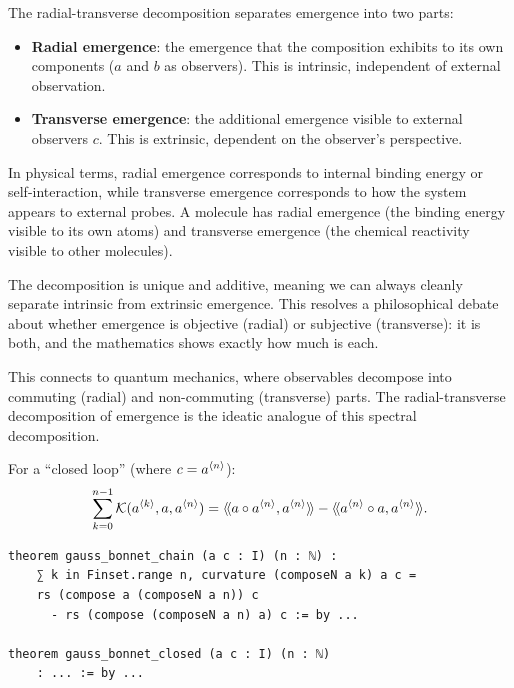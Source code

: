 \begin{interpretation}
The radial-transverse decomposition separates emergence into two parts:
\begin{itemize}
  \item \textbf{Radial emergence}: the emergence that the composition exhibits
    to its own components ($a$ and $b$ as observers). This is intrinsic,
    independent of external observation.
  \item \textbf{Transverse emergence}: the additional emergence visible to
    external observers $c$. This is extrinsic, dependent on the observer's
    perspective.
\end{itemize}

In physical terms, radial emergence corresponds to internal binding energy or
self-interaction, while transverse emergence corresponds to how the system
appears to external probes. A molecule has radial emergence (the binding energy
visible to its own atoms) and transverse emergence (the chemical reactivity
visible to other molecules).

The decomposition is unique and additive, meaning we can always cleanly separate
intrinsic from extrinsic emergence. This resolves a philosophical debate about
whether emergence is objective (radial) or subjective (transverse): it is both,
and the mathematics shows exactly how much is each.

This connects to quantum mechanics, where observables decompose into commuting
(radial) and non-commuting (transverse) parts. The radial-transverse
decomposition of emergence is the ideatic analogue of this spectral decomposition.
\end{interpretation}

\begin{theorem}
For a ``closed loop'' (where $c = a^{\langle n \rangle}$):
\[
  \sum_{k=0}^{n-1} \mathcal{K}(a^{\langle k \rangle}, a, a^{\langle n \rangle}) =
  \langle\!\langle a \circ a^{\langle n \rangle}, a^{\langle n \rangle} \rangle\!\rangle - \langle\!\langle a^{\langle n \rangle} \circ a, a^{\langle n \rangle} \rangle\!\rangle.
\]
\end{theorem}

\begin{lstlisting}[caption={Gauss--Bonnet (IDT\_v3\_Emergence.lean)}]
theorem gauss_bonnet_chain (a c : I) (n : ℕ) :
    ∑ k in Finset.range n, curvature (composeN a k) a c =
    rs (compose a (composeN a n)) c
      - rs (compose (composeN a n) a) c := by ...

theorem gauss_bonnet_closed (a c : I) (n : ℕ)
    : ... := by ...
\end{lstlisting}


